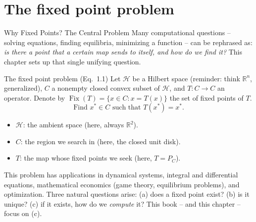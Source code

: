 \documentclass[aspectratio=169,10pt]{beamer}
\newcommand{\Hil}{\mathcal{H}}
\newcommand{\Fix}{\operatorname{Fix}}
\newcommand{\R}{\mathbb{R}}
\begin{document}
\section{The fixed point problem}

\begin{frame}{Why Fixed Points? The Central Problem}
\small
Many computational questions -- solving equations, finding equilibria,
minimizing a function -- can be rephrased as: \emph{is there a point that a
certain map sends to itself, and how do we find it?} This chapter sets up
that single unifying question.

\begin{block}{The fixed point problem (Eq.\ 1.1)}
Let $\Hil$ be a Hilbert space (reminder: think $\R^n$, generalized), $C$ a
nonempty closed convex subset of $\Hil$, and $T:C\to C$ an operator. Denote
by $\Fix(T)=\{x\in C: x=T(x)\}$ the set of fixed points of $T$.
\[
  \text{Find } x^*\in C \text{ such that } T(x^*)=x^*.
\]
\begin{itemize}
  \item $\Hil$: the ambient space (here, always $\R^2$).
  \item $C$: the region we search in (here, the closed unit disk).
  \item $T$: the map whose fixed points we seek (here, $T=P_C$).
\end{itemize}
\end{block}

This problem has applications in dynamical systems, integral and
differential equations, mathematical economics (game theory, equilibrium
problems), and optimization. Three natural questions arise: (a) does a
fixed point exist? (b) is it unique? (c) if it exists, how do we
\emph{compute} it? This book -- and this chapter -- focus on (c).

\end{frame}
\end{document}
